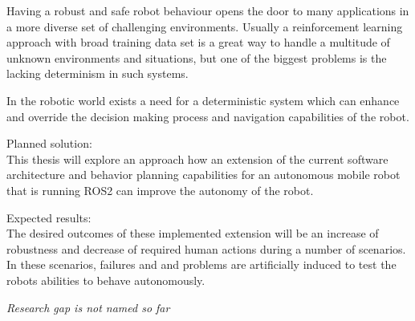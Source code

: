 Having a robust and safe robot behaviour opens the door to many applications in a more diverse set of challenging environments. Usually a reinforcement learning approach with broad training data set is a great way to handle a multitude of unknown environments and situations, but one of the biggest problems is the lacking determinism in such systems.

In the robotic world exists a need for a deterministic system which can enhance and override the decision making process and navigation capabilities of the robot. 

Planned solution:\\

This thesis will explore an approach how an extension of the current software architecture and behavior planning capabilities for an autonomous mobile robot that is running ROS2 can improve the autonomy of the robot. 

Expected results:\\

The desired outcomes of these implemented extension will be an increase of robustness and decrease of required human actions during a number of scenarios. In these scenarios, failures and and problems are artificially induced to test the robots abilities to behave autonomously. 

\textit{Research gap is not named so far}



	
	


